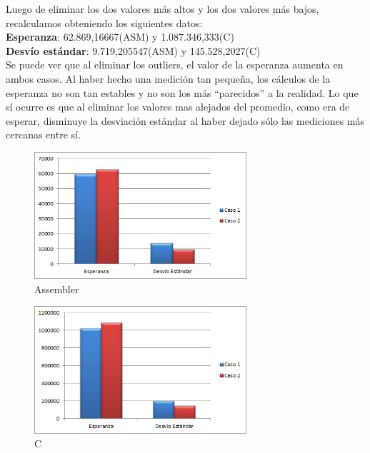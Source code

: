 \begin{enumerate}
	Luego de eliminar los dos valores m\'as altos y los dos valores m\'as bajos, recalculamos obteniendo los siguientes datos: \\
	\textbf{Esperanza}: 62.869,16667(ASM) y 1.087.346,333(C)\\
	\textbf{Desvío est\'andar}:	9.719,205547(ASM) y 145.528,2027(C)\\

	Se puede ver que al eliminar los outliers, el valor de la esperanza aumenta en ambos casos. Al haber hecho una medici\'on tan peque\~na, los c\'alculos de la esperanza no son tan estables y no son los m\'as ``parecidos'' a la realidad. Lo que s\'i ocurre es que al eliminar los valores mas alejados del promedio, como era de esperar, disminuye la desviaci\'on est\'andar al haber dejado s\'olo las mediciones m\'as cercanas entre s\'i.\\

\begin{figure}[h!]
  \begin{center}
	\includegraphics[width=0.7\textwidth]{imagenes/13/asm1.jpg}
	\caption{Assembler}
      \end{center}
\end{figure}

\newpage 
\begin{figure}[h!]
  \begin{center}
	\includegraphics[width=0.7\textwidth]{imagenes/13/C1.jpg}
	\caption{C}
  \end{center}
\end{figure}


\end{enumerate}

